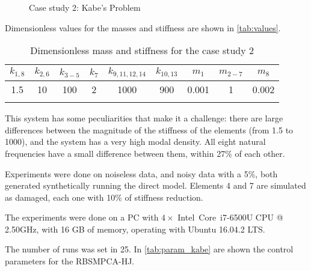\begin{figure}[H]
\caption{Case study 2: Kabe's Problem}
\label{fig:kabe}
\centering
{}
\end{figure}

Dimensionless values for the masses and stiffness are shown in \autoref{tab:values}.

\begin{table}[H]
    \caption{Dimensionless mass and stiffness for the case study 2}
    \label{tab:values}
    \footnotesize
    \centering
    \begin{tabular}{ccccccccc}
        \hline
         $k_{1,8}$ & $k_{2, 6}$ & $k_{3-5}$ & $k_7$ & $k_{9,11,12,14}$ & $k_{10,13}$ & $m_{1}$ & $m_{2-7}$ & $m_{8}$  \\
        \hline
        1.5 & 10 & 100 & 2 & 1000 & 900 & 0.001 & 1 & 0.002 \\
        \hline
        \\
    \end{tabular}
\end{table}

This system has some peculiarities that make it a challenge: there are large differences between the magnitude of the stiffness of the elements (from 1.5 to 1000), and the system has a very high modal density. All eight natural frequencies have a small difference between them, within 27\% of each other.

Experiments were done on noiseless data, and noisy data with a 5\%, both generated synthetically running the direct model. Elements 4 and 7 are simulated as damaged, each one with 10\% of stiffness reduction.

The experiments were done on a PC with $4\times$ Intel\textregistered\, Core\texttrademark\, i7-6500U CPU @ 2.50GHz, with 16 GB of memory, operating with Ubuntu 16.04.2 LTS.

The number of runs was set in 25. In \autoref{tab:param_kabe} are shown the control parameters for the RBSMPCA-HJ.

